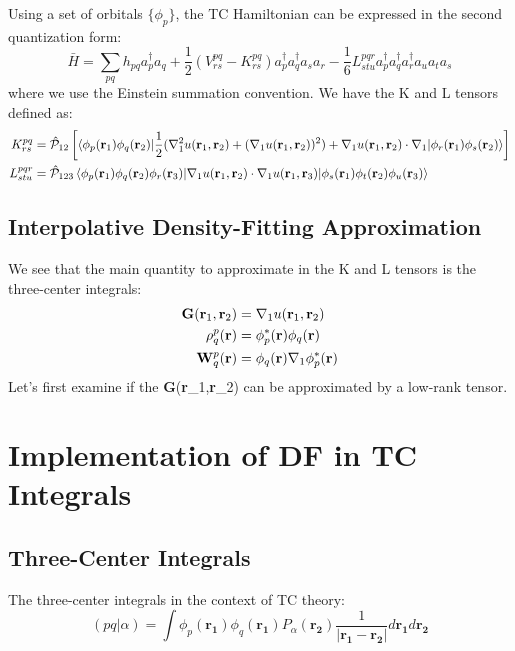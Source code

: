\documentclass[12pt]{article}
\begin{document}
Using a set of orbitals $\{\phi_p\}$, the TC Hamiltonian can be expressed in the second quantization form:
\begin{equation}
    \bar{H} = \sum_{pq} h_{pq} a_p^\dagger a_q + \frac{1}{2} (V^{pq}_{rs}-K^{pq}_{rs}) a_p^\dagger a_q^\dagger a_s a_r - \frac{1}{6}L^{pqr}_{stu}a_p^\dagger a_q^\dagger a_r^\dagger a_u a_t a_s
\end{equation}
where we use the Einstein summation convention.
We have the K and L tensors defined as:
\begin{equation}
    \begin{aligned}
        K^{pq}_{rs} &= \hat{\mathcal{P}}_{12}\left[\braket{\phi_p({\bf r}_1)\phi_q({\bf r}_2)|\frac{1}{2}(\nabla_1^2 u({\bf r}_1,{\bf r}_2)+(\nabla_1 u({\bf r}_1,{\bf r}_2))^2)+\nabla_1 u({\bf r}_1,{\bf r}_2)\cdot\nabla_1|\phi_r({\bf r}_1)\phi_s({\bf r}_2)}\right] \\
        L^{pqr}_{stu} &= \hat{\mathcal{P}}_{123}\braket{\phi_p({\bf r}_1)\phi_q({\bf r}_2)\phi_r({\bf r}_3)|\nabla_1 u({\bf r}_1,{\bf r}_2)\cdot\nabla_1 u({\bf r}_1,{\bf r}_3)|\phi_s({\bf r}_1)\phi_t({\bf r}_2)\phi_u({\bf r}_3)}
    \end{aligned}
\end{equation}


\subsection{Interpolative Density-Fitting Approximation}
We see that the main quantity to approximate in the K and L tensors is the three-center integrals:
\begin{equation}
    \begin{aligned}
    {\bf G}({\bf r}_1,{\bf r}_2)&=\nabla_1 u({\bf r}_1,{\bf r}_2)\\
    \rho^p_q ({\bf r})&= \phi^*_p({\bf r})\phi_q({\bf r})\\
    {\bf W}^p_q({\bf r}) &= \phi_q({\bf r}) \nabla_1\phi^*_p({\bf r})
    \end{aligned}
\end{equation}
Let's first examine if the {\bf G}({\bf r}_1,{\bf r}_2) 
can be approximated by a low-rank tensor. 


\section{Implementation of DF in TC Integrals}
\subsection{Three-Center Integrals}
The three-center integrals in the context of TC theory:
\begin{equation}
    (pq|\alpha) = \int \phi_p(\mathbf{r_1}) \phi_q(\mathbf{r_1}) P_\alpha(\mathbf{r_2}) 
    \frac{1}{|\mathbf{r_1} - \mathbf{r_2}|} d\mathbf{r_1}d\mathbf{r_2}
\end{equation}
\end{document}
